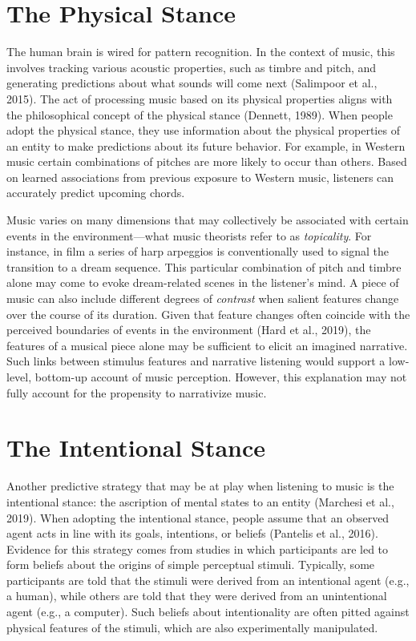 \documentclass[12pt,twoside]{reedthesis}
\begin{document}
\section{The Physical Stance}
The human brain is wired for pattern recognition. In the context of music, this involves tracking various acoustic properties, such as timbre and pitch, and generating predictions about what sounds will come next (Salimpoor et al., 2015). The act of processing music based on its physical properties aligns with the philosophical concept of the physical stance (Dennett, 1989). When people adopt the physical stance, they use information about the physical properties of an entity to make predictions about its future behavior. For example, in Western music certain combinations of pitches are more likely to occur than others. Based on learned associations from previous exposure to Western music, listeners can accurately predict upcoming chords. 

Music varies on many dimensions that may collectively be associated with certain events in the environment—what music theorists refer to as \emph{topicality}. For instance, in film a series of harp arpeggios is conventionally used to signal the transition to a dream sequence. This particular combination of pitch and timbre alone may come to evoke dream-related scenes in the listener’s mind. A piece of music can also include different degrees of \emph{contrast} when salient features change over the course of its duration. Given that feature changes often coincide with the perceived boundaries of events in the environment (Hard et al., 2019), the features of a musical piece alone may be sufficient to elicit an imagined narrative. Such links between stimulus features and narrative listening would support a low-level, bottom-up account of music perception. However, this explanation may not fully account for the propensity to narrativize music. 

\section{The Intentional Stance}
Another predictive strategy that may be at play when listening to music is the intentional stance: the ascription of mental states to an entity (Marchesi et al., 2019). When adopting the intentional stance, people assume that an observed agent acts in line with its goals, intentions, or beliefs (Pantelis et al., 2016). Evidence for this strategy comes from studies in which participants are led to form beliefs about the origins of simple perceptual stimuli. Typically, some participants are told that the stimuli were derived from an intentional agent (e.g., a human), while others are told that they were derived from an unintentional agent (e.g., a computer). Such beliefs about intentionality are often pitted against physical features of the stimuli, which are also experimentally manipulated.
\end{document}
